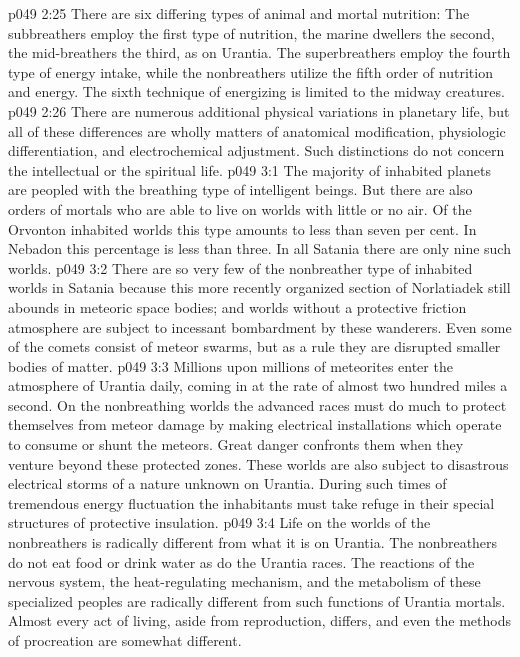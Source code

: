 \vs p049 2:25 There are six differing types of animal and mortal nutrition: The subbreathers employ the first type of nutrition, the marine dwellers the second, the mid\hyp{}breathers the third, as on Urantia. The superbreathers employ the fourth type of energy intake, while the nonbreathers utilize the fifth order of nutrition and energy. The sixth technique of energizing is limited to the midway creatures.
\pc \vs p049 2:26 \bibnobreakspace {} There are numerous additional physical variations in planetary life, but all of these differences are wholly matters of anatomical modification, physiologic differentiation, and electrochemical adjustment. Such distinctions do not concern the intellectual or the spiritual life.
\vs p049 3:1 The majority of inhabited planets are peopled with the breathing type of intelligent beings. But there are also orders of mortals who are able to live on worlds with little or no air. Of the Orvonton inhabited worlds this type amounts to less than seven per cent. In Nebadon this percentage is less than three. In all Satania there are only nine such worlds.
\vs p049 3:2 There are so very few of the nonbreather type of inhabited worlds in Satania because this more recently organized section of Norlatiadek still abounds in meteoric space bodies; and worlds without a protective friction atmosphere are subject to incessant bombardment by these wanderers. Even some of the comets consist of meteor swarms, but as a rule they are disrupted smaller bodies of matter.
\vs p049 3:3 Millions upon millions of meteorites enter the atmosphere of Urantia daily, coming in at the rate of almost two hundred miles a second. On the nonbreathing worlds the advanced races must do much to protect themselves from meteor damage by making electrical installations which operate to consume or shunt the meteors. Great danger confronts them when they venture beyond these protected zones. These worlds are also subject to disastrous electrical storms of a nature unknown on Urantia. During such times of tremendous energy fluctuation the inhabitants must take refuge in their special structures of protective insulation.
\vs p049 3:4 Life on the worlds of the nonbreathers is radically different from what it is on Urantia. The nonbreathers do not eat food or drink water as do the Urantia races. The reactions of the nervous system, the heat\hyp{}regulating mechanism, and the metabolism of these specialized peoples are radically different from such functions of Urantia mortals. Almost every act of living, aside from reproduction, differs, and even the methods of procreation are somewhat different.
